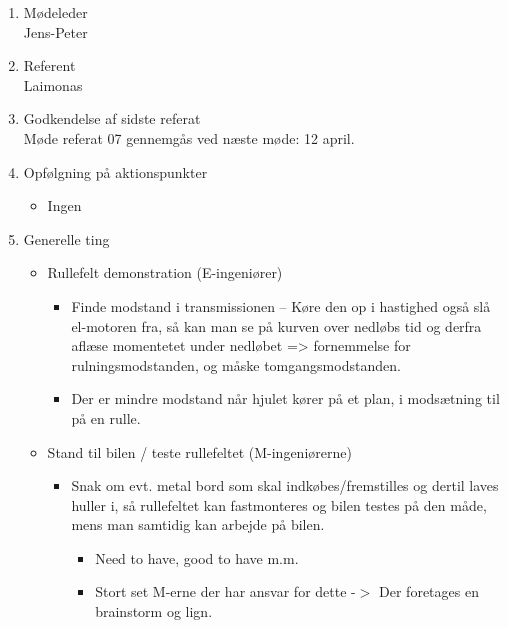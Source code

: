 	\begin{enumerate}
		\itemsep 0.3em 
		\item Mødeleder\\
			Jens-Peter
		\item Referent\\
			Laimonas
		\item Godkendelse af sidste referat\\
			Møde referat 07 gennemgås ved næste møde: 12 april. 

		\item Opfølgning på aktionspunkter
		\begin{itemize}
			\itemsep 0.3em 
			\item Ingen
		\end{itemize}
		
		\item Generelle ting
			\begin{itemize}
				\item Rullefelt demonstration (E-ingeniører)
			
				\begin{itemize}
					\item Finde modstand i transmissionen – Køre den op i hastighed også slå el-motoren fra, så kan man se på kurven over nedløbs tid og derfra aflæse momentetet under nedløbet => fornemmelse for  rulningsmodstanden, og måske tomgangsmodstanden. 
					\item Der er mindre modstand når hjulet kører på et plan, i modsætning  til på en rulle.
				\end{itemize}
				\item Stand til bilen / teste rullefeltet (M-ingeniørerne)
			
				\begin{itemize}
					\item Snak om evt. metal bord som skal indk\o{}bes/fremstilles og dertil laves huller
					i, s\aa{} rullefeltet kan fastmonteres og bilen testes p\aa{} den m\aa{}de, mens
					man samtidig kan arbejde p\aa{} bilen.
					
					\begin{itemize}
						\item Need to have, good to have m.m.
						\item Stort set M-erne der har ansvar for dette -$>$ Der foretages en brainstorm og lign.
					\end{itemize}
				\end{itemize}
			\end{itemize}
			

\end{enumerate}
